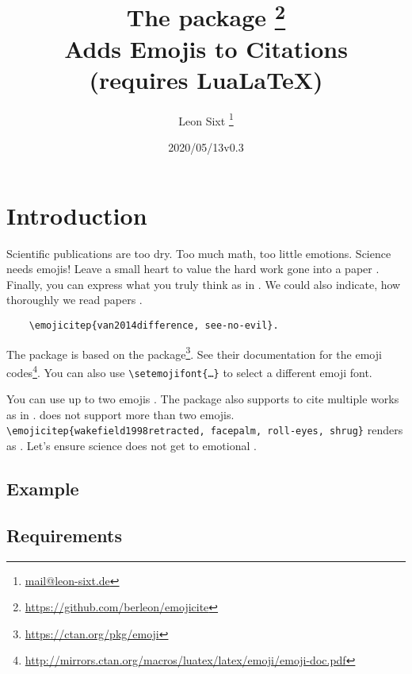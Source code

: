 \documentclass{l3doc}
\title{The \pkg{emojicite} package \thanks{\url{https://github.com/berleon/emojicite}} \\
  Adds Emojis to Citations \\
  \normalsize (requires Lua\LaTeX)}
\author{Leon Sixt \thanks{\url{mail@leon-sixt.de}}}
\date{\emoji{date} 2020/05/13\quad v0.3}
\begin{document}
\maketitle

\tableofcontents

\setlength{\parskip}{0.5em}

\section{Introduction}

Scientific publications are too dry. Too much math, too little emotions. Science
needs emojis!
Leave a small heart to value the hard work gone into a paper .
Finally, you can express what you truly think as in .
We could also indicate, how thoroughly we read papers .

\begin{verbatim}
    \emojicitep{van2014difference, see-no-evil}.
\end{verbatim}


The package is based on the  package\footnote{\url{https://ctan.org/pkg/emoji}}.
See their documentation for the emoji codes\footnote{\url{http://mirrors.ctan.org/macros/luatex/latex/emoji/emoji-doc.pdf}}. You can also use \texttt{\textbackslash setemojifont\{\dots\}} to select a different emoji font.


You can use up to two emojis . The package also supports
to cite multiple works as in .
 does not support more than two emojis.
\texttt{\textbackslash emojicitep\{wakefield1998retracted, facepalm, roll-eyes, shrug\}}
renders as .
Let's ensure science does not get to emotional .

\newpage
\subsection{Example}


\subsection{Requirements}
\end{document}
